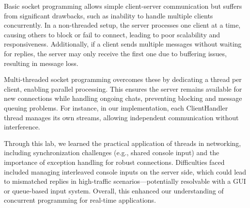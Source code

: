 \documentclass{article}
\begin{document}
Basic socket programming allows simple client-server communication but suffers from significant drawbacks, such as inability to handle multiple clients concurrently. In a non-threaded setup, the server processes one client at a time, causing others to block or fail to connect, leading to poor scalability and responsiveness. Additionally, if a client sends multiple messages without waiting for replies, the server may only receive the first one due to buffering issues, resulting in message loss.

Multi-threaded socket programming overcomes these by dedicating a thread per client, enabling parallel processing. This ensures the server remains available for new connections while handling ongoing chats, preventing blocking and message queuing problems. For instance, in our implementation, each ClientHandler thread manages its own streams, allowing independent communication without interference.

Through this lab, we learned the practical application of threads in networking, including synchronization challenges (e.g., shared console input) and the importance of exception handling for robust connections. Difficulties faced included managing interleaved console inputs on the server side, which could lead to mismatched replies in high-traffic scenarios—potentially resolvable with a GUI or queue-based input system. Overall, this enhanced our understanding of concurrent programming for real-time applications.
\end{document}
